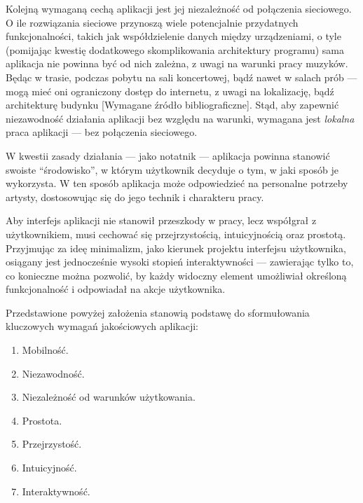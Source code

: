 Kolejną wymaganą cechą aplikacji jest jej niezależność od połączenia sieciowego.
O ile rozwiązania sieciowe przynoszą wiele potencjalnie przydatnych funkcjonalności,
takich jak współdzielenie danych między urządzeniami,
o tyle (pomijając kwestię dodatkowego skomplikowania architektury programu)
sama aplikacja nie powinna być od nich zależna, z uwagi na warunki pracy muzyków.
Będąc w trasie, podczas pobytu na sali koncertowej, bądź nawet w salach prób — mogą mieć oni ograniczony dostęp do internetu,
z uwagi na lokalizację, bądź architekturę budynku [Wymagane źródło bibliograficzne].
Stąd, aby zapewnić niezawodność działania aplikacji bez względu na warunki, wymagana jest \textit{lokalna} praca aplikacji —
bez połączenia sieciowego.

W kwestii zasady działania — jako notatnik — aplikacja powinna stanowić swoiste \enquote{środowisko},
w którym użytkownik decyduje o tym, w jaki sposób je wykorzysta.
W ten sposób aplikacja może odpowiedzieć na personalne potrzeby artysty, dostosowując się do jego technik i charakteru pracy.

Aby interfejs aplikacji nie stanowił przeszkody w pracy, lecz współgrał z użytkownikiem, musi cechować się przejrzystością,
intuicyjnością oraz prostotą.
Przyjmując za ideę minimalizm, jako kierunek projektu interfejsu użytkownika, osiągany jest jednocześnie wysoki stopień
interaktywności — zawierając tylko to, co konieczne można pozwolić, by każdy widoczny element umożliwiał określoną
funkcjonalność i odpowiadał na akcje użytkownika.

Przedstawione powyżej założenia stanowią podstawę do sformułowania kluczowych wymagań jakościowych aplikacji:
\begin{enumerate}
	\item Mobilność.
	\item Niezawodność.
	\item Niezależność od warunków użytkowania.
	\item Prostota.
	\item Przejrzystość.
	\item Intuicyjność.
	\item Interaktywność.
\end{enumerate}

